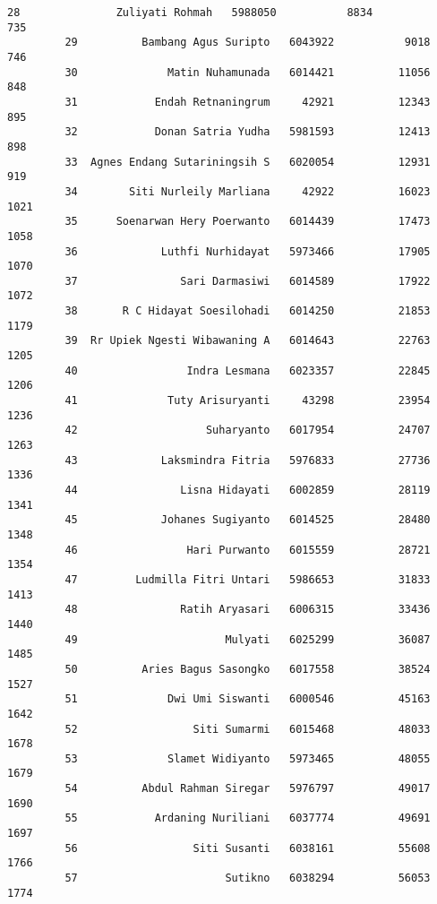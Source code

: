 \documentclass[11pt]{article}
\begin{document}
\begin{Verbatim}[commandchars=\\\{\}]
         28               Zuliyati Rohmah   5988050           8834               735   
         29          Bambang Agus Suripto   6043922           9018               746   
         30              Matin Nuhamunada   6014421          11056               848   
         31            Endah Retnaningrum     42921          12343               895   
         32            Donan Satria Yudha   5981593          12413               898   
         33  Agnes Endang Sutariningsih S   6020054          12931               919   
         34        Siti Nurleily Marliana     42922          16023              1021   
         35      Soenarwan Hery Poerwanto   6014439          17473              1058   
         36             Luthfi Nurhidayat   5973466          17905              1070   
         37                Sari Darmasiwi   6014589          17922              1072   
         38       R C Hidayat Soesilohadi   6014250          21853              1179   
         39  Rr Upiek Ngesti Wibawaning A   6014643          22763              1205   
         40                 Indra Lesmana   6023357          22845              1206   
         41              Tuty Arisuryanti     43298          23954              1236   
         42                    Suharyanto   6017954          24707              1263   
         43             Laksmindra Fitria   5976833          27736              1336   
         44                Lisna Hidayati   6002859          28119              1341   
         45             Johanes Sugiyanto   6014525          28480              1348   
         46                 Hari Purwanto   6015559          28721              1354   
         47         Ludmilla Fitri Untari   5986653          31833              1413   
         48                Ratih Aryasari   6006315          33436              1440   
         49                       Mulyati   6025299          36087              1485   
         50          Aries Bagus Sasongko   6017558          38524              1527   
         51              Dwi Umi Siswanti   6000546          45163              1642   
         52                  Siti Sumarmi   6015468          48033              1678   
         53              Slamet Widiyanto   5973465          48055              1679   
         54          Abdul Rahman Siregar   5976797          49017              1690   
         55            Ardaning Nuriliani   6037774          49691              1697   
         56                  Siti Susanti   6038161          55608              1766   
         57                       Sutikno   6038294          56053              1774   

\end{Verbatim}
\end{document}

